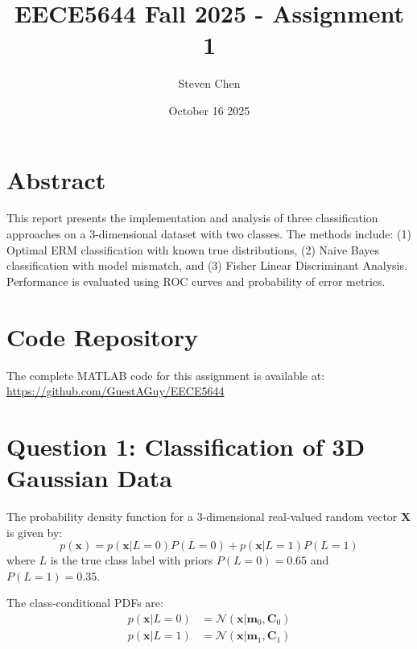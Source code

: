 \documentclass[12pt]{article}
\title{EECE5644 Fall 2025 - Assignment 1}
\author{Steven Chen}
\date{October 16 2025}
\begin{document}
\maketitle

\section*{Abstract}
This report presents the implementation and analysis of three classification approaches on a 3-dimensional dataset with two classes. The methods include: (1) Optimal ERM classification with known true distributions, (2) Naive Bayes classification with model mismatch, and (3) Fisher Linear Discriminant Analysis. Performance is evaluated using ROC curves and probability of error metrics.

\section*{Code Repository}
The complete MATLAB code for this assignment is available at: \\
\url{https://github.com/GuestAGuy/EECE5644}


\newpage


\section{Question 1: Classification of 3D Gaussian Data}

The probability density function for a 3-dimensional real-valued random vector $\mathbf{X}$ is given by:
\[
p(\mathbf{x}) = p(\mathbf{x}|L=0)P(L=0) + p(\mathbf{x}|L=1)P(L=1)
\]
where $L$ is the true class label with priors $P(L=0)=0.65$ and $P(L=1)=0.35$.

The class-conditional PDFs are:
\begin{align*}
p(\mathbf{x}|L=0) &= \mathcal{N}(\mathbf{x}|\mathbf{m}_{0},\mathbf{C}_{0}) \\
p(\mathbf{x}|L=1) &= \mathcal{N}(\mathbf{x}|\mathbf{m}_{1},\mathbf{C}_{1})
\end{align*}
\end{document}
